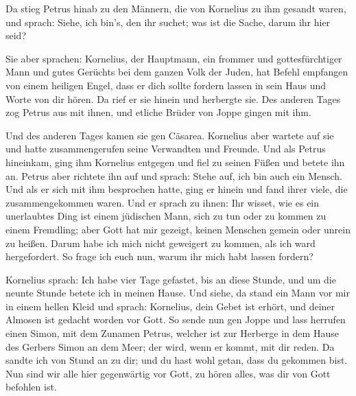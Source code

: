  Da stieg Petrus hinab zu den Männern, die von Kornelius
zu ihm gesandt waren, und sprach: Siehe, ich bin's, den ihr suchet; was
ist die Sache, darum ihr hier seid?

 Sie aber sprachen: Kornelius, der Hauptmann, ein frommer
und gottesfürchtiger Mann und gutes Gerüchts bei dem ganzen Volk der
Juden, hat Befehl empfangen von einem heiligen Engel, dass er dich
sollte fordern lassen in sein Haus und Worte von dir hören.
 Da rief er sie hinein und herbergte sie. Des anderen
Tages zog Petrus aus mit ihnen, und etliche Brüder von Joppe gingen mit
ihm.

 Und des anderen Tages kamen sie gen Cäsarea. Kornelius
aber wartete auf sie und hatte zusammengerufen seine Verwandten und
Freunde.  Und als Petrus hineinkam, ging ihm Kornelius
entgegen und fiel zu seinen Füßen und betete ihn an. 
Petrus aber richtete ihn auf und sprach: Stehe auf, ich bin auch ein
Mensch.  Und als er sich mit ihm besprochen hatte, ging
er hinein und fand ihrer viele, die zusammengekommen waren.
 Und er sprach zu ihnen: Ihr wisset, wie es ein
unerlaubtes Ding ist einem jüdischen Mann, sich zu tun oder zu kommen zu
einem Fremdling; aber Gott hat mir gezeigt, keinen Menschen gemein oder
unrein zu heißen.  Darum habe ich mich nicht geweigert zu
kommen, als ich ward hergefordert. So frage ich euch nun, warum ihr mich
habt lassen fordern?

 Kornelius sprach: Ich habe vier Tage gefastet, bis an
diese Stunde, und um die neunte Stunde betete ich in meinen Hause. Und
siehe, da stand ein Mann vor mir in einem hellen Kleid 
und sprach: Kornelius, dein Gebet ist erhört, und deiner Almosen ist
gedacht worden vor Gott.  So sende nun gen Joppe und lass
herrufen einen Simon, mit dem Zunamen Petrus, welcher ist zur Herberge
in dem Hause des Gerbers Simon an dem Meer; der wird, wenn er kommt, mit
dir reden.  Da sandte ich von Stund an zu dir; und du
hast wohl getan, dass du gekommen bist. Nun sind wir alle hier
gegenwärtig vor Gott, zu hören alles, was dir von Gott befohlen ist.

